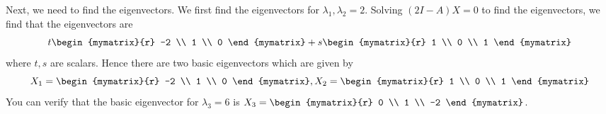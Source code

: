 \begin{solution}
  Next, we need to find the eigenvectors. We first find the
  eigenvectors for $\lambda_1, \lambda_2 = 2$.  Solving
  $(2I - A)X = 0$ to find the eigenvectors, we find that the
  eigenvectors are
  \begin{equation*}
    t\begin{mymatrix}{r}
      -2 \\
      1 \\
      0
    \end{mymatrix} +s\begin{mymatrix}{r}
      1 \\
      0 \\
      1
    \end{mymatrix}
  \end{equation*}
  where $t,s$ are scalars. Hence there are two basic eigenvectors
  which are given by
  \begin{equation*}
    X_1
    =
    \begin{mymatrix}{r}
      -2 \\
      1 \\
      0
    \end{mymatrix},
    X_2
    =
    \begin{mymatrix}{r}
      1 \\
      0 \\
      1
    \end{mymatrix}
  \end{equation*}
  You can verify that the basic eigenvector for $\lambda_3 =6$ is
  $ X_3 = \begin{mymatrix}{r}
    0 \\
    1 \\
    -2
  \end{mymatrix}$.


\end{solution}
